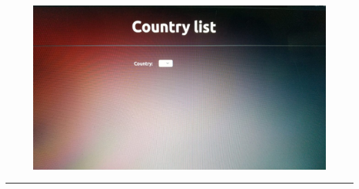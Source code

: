 \documentclass[12pt,letterpaper]{article}
\begin{document}
\subsubsection*{}
\begin{figure}[h!]
    \centering
    \includegraphics[width = \textwidth]{Pics/op3.jpeg}
\end{figure}

\hrule
\end{document}
